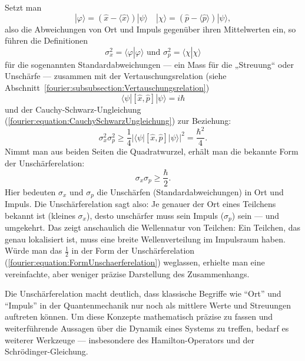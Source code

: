 Setzt man
\begin{equation}
	|\varphi\rangle = (\hat{x} - \langle \hat{x} \rangle) |\psi\rangle \quad |\chi\rangle = (\hat{p} - \langle \hat{p} \rangle) | \psi\rangle,
\end{equation}
also die Abweichungen von Ort und Impuls gegenüber ihren Mittelwerten ein, so führen die Definitionen
\begin{equation}
	\sigma_x^2 = \langle\varphi | \varphi\rangle \text{ und } \sigma_p^2 = \langle\chi | \chi\rangle
\end{equation}
für die sogenannten Standardabweichungen --- ein Mass für die „Streuung“ oder Unschärfe --- zusammen mit der Vertauschungsrelation (siehe Abschnitt~\ref{fourier:subsubsection:Vertauschungsrelation})
%
%
%
\begin{equation}
	\langle\psi | [\hat{x},\hat{p}] | \psi\rangle = i\hbar
\end{equation}
und der Cauchy-Schwarz-Ungleichung (\ref{fourier:equation:CauchySchwarzUngleichung}) zur Beziehung:
\begin{equation}
	\sigma_x^2 \sigma_p^2 \ge \frac{1}{4} |\langle\psi | [\hat{x},\hat{p}] | \psi\rangle|^2 = \frac{\hbar^2}{4}.
\end{equation}
Nimmt man aus beiden Seiten die Quadratwurzel, erhält man die bekannte Form der Unschärferelation:
\begin{equation}\label{fourier:equation:FormUnschaerferelation}
	\sigma_x \sigma_p \ge \frac{\hbar}{2}.
\end{equation}
Hier bedeuten $\sigma_x$ und $\sigma_p$ die Unschärfen (Standardabweichungen) in Ort und Impuls.
Die Unschärferelation sagt also:
Je genauer der Ort eines Teilchens bekannt ist (kleines $\sigma_x$), desto unschärfer muss sein Impuls ($\sigma_p$) sein --- und umgekehrt.
Das zeigt anschaulich die Wellennatur von Teilchen:
Ein Teilchen, das genau lokalisiert ist, muss eine breite Wellenverteilung im Impulsraum haben.
Würde man das $\tfrac{1}{2}$ in der Form der Unschärferelation (\ref{fourier:equation:FormUnschaerferelation}) weglassen, erhielte man eine vereinfachte, aber weniger präzise Darstellung des Zusammenhangs.

Die Unschärferelation macht deutlich, dass klassische Begriffe wie ``Ort'' und ``Impuls'' in der Quantenmechanik nur noch als mittlere Werte und Streuungen auftreten können.
Um diese Konzepte mathematisch präzise zu fassen und weiterführende Aussagen über die Dynamik eines Systems zu treffen, bedarf es weiterer Werkzeuge ---
insbesondere des Hamilton-Operators und der Schrödinger-Gleichung.

